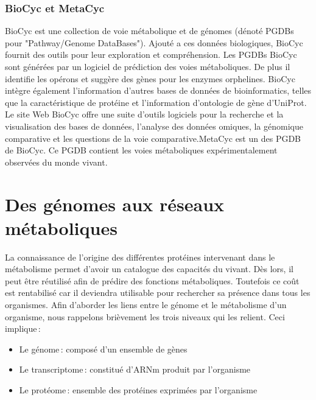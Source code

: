 \begin{refsegment}
    \subsubsection{BioCyc et MetaCyc}
    BioCyc \cite{caspi2006metacyc,caspi2008metacyc,caspi2010metacyc,caspi2012metacyc,caspi2014metacyc,caspi2016metacyc} est une collection de voie métabolique et de génomes (dénoté PGDBs pour "Pathway/Genome DataBases"). Ajouté a ces données biologiques, BioCyc fournit des outils pour leur exploration et compréhension. Les PGDBs BioCyc sont générées par un logiciel de prédiction des voies métaboliques. De plus il identifie les opérons et suggère des gènes pour les enzymes orphelines. BioCyc intègre également l'information d'autres bases de données de bioinformatics, telles que la caractéristique de protéine et l'information d'ontologie de gène d'UniProt. Le site Web BioCyc offre une suite d'outils logiciels pour la recherche et la visualisation des bases de données, l'analyse des données omiques, la génomique comparative et les questions de la voie comparative.MetaCyc est un des PGDB de BioCyc. Ce PGDB contient les voies métaboliques expérimentalement observées du monde vivant. 
    
    
    \section{Des génomes aux réseaux métaboliques}
    
    La connaissance de l'origine des différentes protéines intervenant dans le métabolisme permet d'avoir un catalogue des capacités du vivant. Dès lors, il peut être réutilisé afin de prédire des fonctions métaboliques. Toutefois ce coût est rentabilisé car il deviendra utilisable pour rechercher sa présence dans tous les organismes. Afin d'aborder les liens entre le génome et le métabolisme d'un organisme, nous rappelons brièvement les trois niveaux qui les relient. Ceci implique :
    
    \begin{itemize}
        \item Le génome : composé d'un ensemble de gènes
        \item Le transcriptome : constitué d'\gls{ARNm} produit par l'organisme
        \item Le protéome : ensemble des protéines exprimées par l'organisme
    \end{itemize}
    

\end{refsegment}
